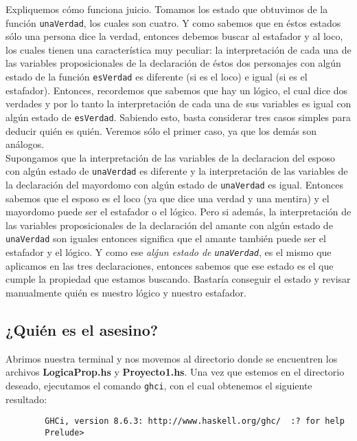 \documentclass[letterpaper,12pt]{article}
\begin{document}
\begin{itemize}
        Expliquemos cómo funciona juicio. Tomamos los estado que obtuvimos de 
        la función \texttt{unaVerdad}, los cuales son cuatro. Y como sabemos 
        que en éstos estados sólo una persona dice la verdad, entonces debemos
        buscar al estafador y al loco, los cuales tienen una característica muy
        peculiar: la interpretación de cada una de las variables 
        proposicionales de la declaración de éstos dos personajes con algún 
        estado de la función \texttt{esVerdad} es diferente (si es el loco) e 
        igual (si es el estafador). Entonces, recordemos que sabemos que hay 
        un lógico, el cual dice dos verdades y por lo tanto la interpretación 
        de cada una de sus variables es igual con algún estado de 
        \texttt{esVerdad}. Sabiendo esto, basta considerar tres casos simples
        para deducir quién es quién. Veremos sólo el primer caso, ya que los
        demás son análogos. \\
        Supongamos que la interpretación de las variables de la declaracion del
        esposo con algún estado de \texttt{unaVerdad} es diferente y la 
        interpretación de las variables de la declaración del mayordomo con 
        algún estado de \texttt{unaVerdad} es igual. Entonces sabemos que el 
        esposo es el loco (ya que dice una verdad y una mentira) y el mayordomo 
        puede ser el estafador o el lógico. Pero si además, la interpretación de
        las variables proposicionales de la declaración del amante con algún 
        estado de \texttt{unaVerdad} son iguales entonces significa que el 
        amante también puede ser el estafador y el lógico. Y como ese 
        \textit{alǵun estado de \texttt{unaVerdad}}, es el mismo que aplicamos
        en las tres declaraciones, entonces sabemos que ese estado es el que 
        cumple la propiedad que estamos buscando. Bastaría conseguir el estado 
        y revisar manualmente quién es nuestro lógico y nuestro estafador. 
    \end{itemize}

    \subsection{¿Quién es el asesino?}
    Abrimos nuestra terminal y nos movemos al directorio donde se encuentren 
    los archivos \textbf{LogicaProp.hs} y \textbf{Proyecto1.hs}. Una vez que 
    estemos en el directorio deseado, ejecutamos el comando \texttt{ghci}, 
    con el cual obtenemos el siguiente resultado:
    \begin{lstlisting}
        GHCi, version 8.6.3: http://www.haskell.org/ghc/  :? for help
        Prelude> 
    \end{lstlisting}
\end{document}
